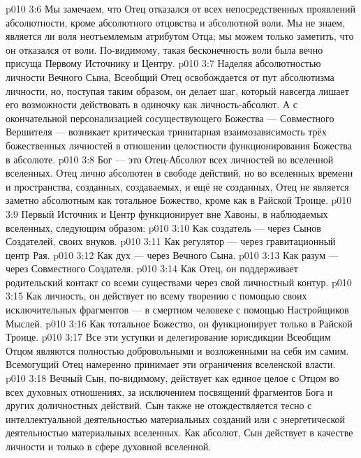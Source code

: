 \vs p010 3:6 Мы замечаем, что Отец отказался от всех непосредственных проявлений абсолютности, кроме абсолютного отцовства и абсолютной воли. Мы не знаем, является ли воля неотъемлемым атрибутом Отца; мы можем только заметить, что он  отказался от воли. По\hyp{}видимому, такая бесконечность воли была вечно присуща Первому Источнику и Центру.
\vs p010 3:7 Наделяя абсолютностью личности Вечного Сына, Всеобщий Отец освобождается от пут абсолютизма личности, но, поступая таким образом, он делает шаг, который навсегда лишает его возможности действовать в одиночку как личность\hyp{}абсолют. А с окончательной персонализацией сосуществующего Божества --- Совместного Вершителя --- возникает критическая тринитарная взаимозависимость трёх божественных личностей в отношении целостности функционирования Божества в абсолюте.
\vs p010 3:8 Бог --- это Отец\hyp{}Абсолют всех личностей во вселенной вселенных. Отец лично абсолютен в свободе действий, но во вселенных времени и пространства, созданных, создаваемых, и ещё не созданных, Отец не является заметно абсолютным как тотальное Божество, кроме как в Райской Троице.
\vs p010 3:9 \pc Первый Источник и Центр функционирует вне Хавоны, в наблюдаемых вселенных, следующим образом:
\vs p010 3:10 Как создатель --- через Сынов Создателей, своих внуков.
\vs p010 3:11 Как регулятор --- через гравитационный центр Рая.
\vs p010 3:12 Как дух --- через Вечного Сына.
\vs p010 3:13 Как разум --- через Совместного Создателя.
\vs p010 3:14 Как Отец, он поддерживает родительский контакт со всеми существами через свой личностный контур.
\vs p010 3:15 Как личность, он действует  по всему творению с помощью своих исключительных фрагментов --- в смертном человеке с помощью Настройщиков Мыслей.
\vs p010 3:16 Как тотальное Божество, он функционирует только в Райской Троице.
\vs p010 3:17 \pc Все эти уступки и делегирование юрисдикции Всеобщим Отцом являются полностью добровольными и возложенными на себя им самим. Всемогущий Отец намеренно принимает эти ограничения вселенской власти.
\vs p010 3:18 \pc Вечный Сын, по\hyp{}видимому, действует как единое целое с Отцом во всех духовных отношениях, за исключением посвящений фрагментов Бога и других доличностных действий. Сын также не отождествляется тесно с интеллектуальной деятельностью материальных созданий или с энергетической деятельностью материальных вселенных. Как абсолют, Сын действует в качестве личности и только в сфере духовной вселенной.
